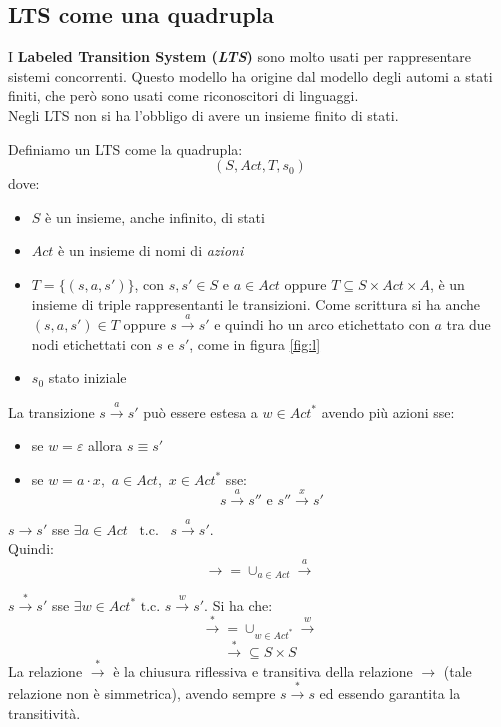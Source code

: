 \subsection{LTS come una quadrupla}
I \textbf{Labeled Transition System (\textit{LTS})} sono molto usati per
rappresentare sistemi concorrenti. Questo modello ha origine dal modello degli
automi a stati finiti, che però sono usati come riconoscitori di linguaggi.\\
Negli LTS non si ha l'obbligo di avere un insieme finito di stati.
\begin{definizione}
  Definiamo un LTS come la quadrupla:
  \[(S, Act, T, s_0)\]
  dove:
  \begin{itemize}
    \item $S$ è un insieme, anche infinito, di stati
    \item $Act$ è un insieme di nomi di \textit{azioni}
    \item $T=\{(s, a, s')\}$, con $s, s'\in S$ e $a\in Act$ oppure $T\subseteq
    S\times Act\times A$, è un insieme di triple rappresentanti le
    transizioni. Come scrittura si ha anche $(s, a, s')\in T$ oppure
    $s\stackrel{a}{\rightarrow} s'$ e quindi ho un arco etichettato con $a$ tra
    due nodi etichettati con $s$ e $s'$, come in figura \ref{fig:l}
    \item $s_0$ stato iniziale
  \end{itemize}
\end{definizione} \vspace{5mm} %
\begin{definizione} 
  La transizione $s\stackrel{a}{\rightarrow} s'$ può essere estesa a $w\in
  Act^*$ avendo più azioni sse:
  \begin{itemize}
    \item se $w=\varepsilon$ allora $s\equiv s'$
    \item se $w=a\cdot x,\,\, a\in Act,\,\, x\in Act^*$ sse:
    \[s\stackrel{a}{\rightarrow} s'' \mbox{ e } s''\stackrel{x}{\rightarrow}
      s'\]
  \end{itemize}
\end{definizione} \vspace{5mm} %
\begin{definizione}
  $s\rightarrow s'$ sse $\exists a \in Act\,\,\,\mbox{ t.c. }\,\,\,
  s\stackrel{a}{\rightarrow} s'$.\\
  Quindi:
  \[\rightarrow =\cup_{a\in Act}\stackrel{a}{\rightarrow}\]
\end{definizione} \vspace{5mm} %
\begin{definizione}
  $s\stackrel{*}{\rightarrow} s'$ sse $\exists w\in Act^*\mbox{ t.c. }
  s\stackrel{w}{\rightarrow} s'$. Si ha che:
  \[\stackrel{*}{\rightarrow}=\cup_{w\in Act^*}\stackrel{w}{\rightarrow}\]
  \[\stackrel{*}{\rightarrow}\subseteq S\times S\]
  La relazione $\stackrel{*}{\rightarrow}$ è la chiusura riflessiva e transitiva
  della relazione $\rightarrow$ (tale relazione non è simmetrica), avendo sempre
  $s\stackrel{*}{\rightarrow}s$ ed essendo garantita la transitività.
\end{definizione} \vspace{5mm} %
